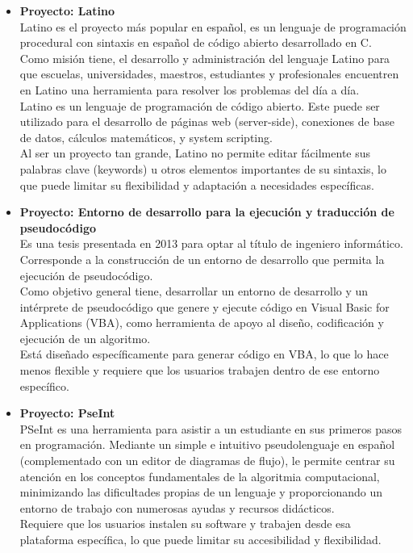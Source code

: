 \vspace{-1em}
\begin{itemize}
  \item \textbf{Proyecto: Latino}\\
  Latino es el proyecto más popular en español, es un lenguaje de programación procedural con sintaxis en español de código abierto desarrollado en C.\\
  Como misión tiene, el desarrollo y administración del lenguaje Latino para que escuelas, universidades, maestros, estudiantes y profesionales encuentren en Latino una herramienta para resolver los problemas del día a día. \parencite{Guerrero2021}\\
  Latino es un lenguaje de programación de código abierto. Este puede ser utilizado para el desarrollo de páginas web (server-side), conexiones de base de datos, cálculos matemáticos, y system scripting.\\
  Al ser un proyecto tan grande, Latino no permite editar fácilmente sus palabras clave (keywords) u otros elementos importantes de su sintaxis, lo que puede limitar su flexibilidad y adaptación a necesidades específicas.

  \item \textbf{Proyecto: Entorno de desarrollo para la ejecución y traducción de pseudocódigo}\\
  Es una tesis presentada en 2013 para optar al título de ingeniero informático. Corresponde a la construcción de un entorno de desarrollo que permita la ejecución de pseudocódigo.\\
  Como objetivo general tiene, desarrollar un entorno de desarrollo y un intérprete de pseudocódigo que genere y ejecute código en Visual Basic for Applications (VBA), como herramienta de apoyo al diseño, codificación y ejecución de un algoritmo. \parencite{JaraLoayza2013}\\
  Está diseñado específicamente para generar código en VBA, lo que lo hace menos flexible y requiere que los usuarios trabajen dentro de ese entorno específico.

  \item \textbf{Proyecto: PseInt}\\
  PSeInt es una herramienta para asistir a un estudiante en sus primeros pasos en programación. Mediante un simple e intuitivo pseudolenguaje en español (complementado con un editor de diagramas de flujo), le permite centrar su atención en los conceptos fundamentales de la algoritmia computacional, minimizando las dificultades propias de un lenguaje y proporcionando un entorno de trabajo con numerosas ayudas y recursos didácticos. \parencite{Novara2023}\\
  Requiere que los usuarios instalen su software y trabajen desde esa plataforma específica, lo que puede limitar su accesibilidad y flexibilidad.
\end{itemize}

